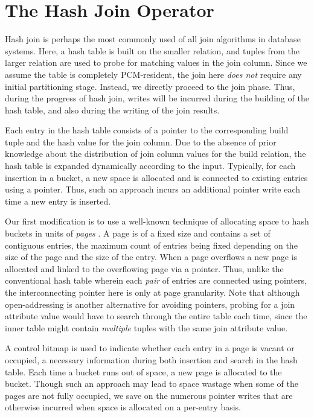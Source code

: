\section{The Hash Join Operator}
\label{hj}
Hash join is perhaps the most commonly used of all join algorithms in
database systems. Here, a hash table is built on the smaller relation,
and tuples from the larger relation are used to probe for matching values
in the join column. Since we assume the table is completely PCM-resident, the join here \emph{does not} require any initial partitioning stage. Instead, we directly proceed to the join phase. Thus, during the progress of hash join,
writes will be incurred during the building of the hash table, and also
during the writing of the join results.

Each entry in the hash table consists of a pointer to the corresponding
build tuple and the hash value for the join column. Due to the
absence of prior knowledge about the distribution of join column values
for the build relation, the hash table is expanded dynamically according
to the input. Typically, for each insertion in a bucket, a new space is
allocated and is connected to existing entries using a pointer. Thus,
such an approach incurs an additional pointer write each time a new
entry is inserted.

Our first modification is to use a well-known technique of allocating space to hash buckets in units of \textit{pages} \cite{paging}. A page is of a fixed size and contains a set of contiguous
entries, the maximum count of entries being fixed depending on the size
of the page and the size of the entry. When a page overflows a new page
is allocated and linked to the overflowing page via a pointer.  Thus,
unlike the conventional hash table wherein each \emph{pair} of entries
are connected using pointers, the interconnecting pointer here is only
at page granularity. Note that although open-addressing is another alternative for avoiding pointers, probing for a join attribute value would have to search through the entire table each time, since the inner table might contain \emph{multiple} tuples with the same join attribute value.

A control bitmap is used to indicate whether each entry in a page is vacant
or occupied, a necessary information during both insertion and search in the
hash table. Each time a bucket runs out of space, a new page is allocated
to the bucket. Though such an approach  may lead to space wastage when
some of the pages are not fully occupied, we save on the numerous pointer
writes that are otherwise incurred when space is allocated on a per-entry basis.

